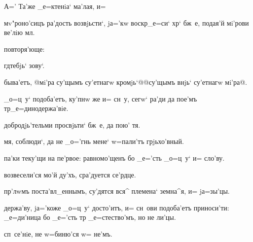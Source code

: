 А='%
Та'же _е=ктенiа` ма'лая, и=%


мv"роно'сицъ ра'дость возвjьсти`, jа='кw воскр _е=си` 
хр` бж~е, подая'й мi'рови ве'лiю мл.

повторя'юще:%

гд тебjь` зову`.

быва'етъ, @мi'ра су'щымъ су'етнагw кромjь`@{@су'щымъ 
внjь` су'етнагw мi'ра@}.

_о=ц~у` подоба'етъ, ку'пнw же и= сн~у, сегw` ра'ди да 
пое'мъ тр _е=динодержа'вiе.



добродjь'тельми просвjьти` бж~е, да пою' тя.

мя, соблюди`, да не _о='гнь мене` w=пали'тъ грjьхо'вный.

па'ки теку'щи на пе'рвое: равномо'щенъ бо _е='сть _о=ц~у` 
и= сло'ву.



возвесели'ся мо'й ду'хъ, сра'дуется се'рдце.

пр'лwмъ поста'вл_еннымъ, су'дятся вся^ племена` 
земна^я, и= jа=зы'цы.

держа'ву, jа='коже _о=ц~у` досто'итъ, и= сн~ови 
подоба'етъ приноси'ти: _е=ди'ница бо _е='сть тр 
_е=стество'мъ, но не ли'цы.



сп~се'нiе, не w=биню'ся w= не'мъ.


